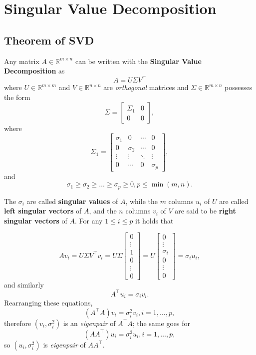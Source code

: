 \documentclass[10pt]{report}
\begin{document}
\chapter{Singular Value Decomposition}
\label{sec:org49d1cf1}
\section{Theorem of SVD}
\label{sec:org699ee5b}
Any matrix \(A \in \mathbb{R}^{m \times n}\) can be written with the \textbf{Singular Value Decomposition} as $$A = U\Sigma V^\top$$ where \(U \in \mathbb{R}^{m \times m}\) and \(V \in \mathbb{R}^{n \times n}\) are \emph{orthogonal} matrices and \(\Sigma \in \mathbb{R}^{m \times n}\) possesses the form
\[\Sigma = \begin{bmatrix}\Sigma_1 & 0 \\ 0 & 0\end{bmatrix},\] where
\[\Sigma_1 = \begin{bmatrix} \sigma_1 & 0 & \cdots & 0 \\ 0 & \sigma_2 & \cdots & 0 \\ \vdots & \vdots & \ddots & \vdots \\ 0 & \cdots & 0 & \sigma_p\end{bmatrix},\] and $$\sigma_1 \geq \sigma_2 \geq \dots \geq \sigma_p \geq 0, p \leq \min(m,n).$$

The \(\sigma_i\) are called \textbf{singular values} of \(A\), while the \(m\) columns \(u_i\) of \(U\) are called \textbf{left singular vectors} of \(A\), and the \(n\) columns \(v_i\) of \(V\) are said to be \textbf{right singular vectors} of \(A\). For any \(1 \leq i \leq p\) it holds that

$$Av_i = U\Sigma V^\top v_i = U\Sigma \begin{bmatrix}0 \\ \vdots \\ 1 \\ 0 \\ \vdots \\ 0\end{bmatrix} = U\begin{bmatrix}0 \\ \vdots \\ \sigma_i \\ 0 \\ \vdots \\ 0\end{bmatrix} = \sigma_i u_i,$$ and similarly $$A^\top u_i = \sigma_i v_i.$$ Rearranging these equations, $$(A^\top A)v_i = \sigma^2_i v_i, i = 1,\dots, p,$$ therefore \((v_i, \sigma^2_i)\) is an \emph{eigenpair} of \(A^\top A\); the same goes for $$(AA^\top )u_i = \sigma^2_i u_i, i = 1,\dots, p,$$ so \((u_i, \sigma^2_i)\) is \emph{eigenpair} of \(AA^\top\).
\end{document}
